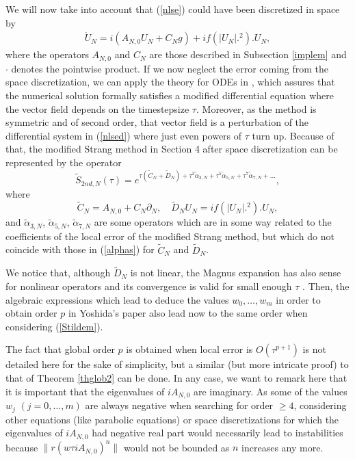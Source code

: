 \documentclass[a4paper,12pt]{article}
\begin{document}
We will now take into account that (\ref{nlse}) could have been discretized in space by
\begin{eqnarray}
\dot{U}_N=i (A_{N,0}U_N+ C_N g)+i f(|U_N|.^2). U_N,
\label{nlsed}
\end{eqnarray}
where the operators $A_{N,0}$ and $C_N$ are those described in Subsection \ref{implem} and $\cdot$ denotes the pointwise product.
If we now neglect the error coming from the space discretization, we can apply the theory for ODEs in \cite{Hairer_IG}, which assures that
the numerical solution formally satisfies a modified differential equation where the vector field depends on the timestepsize $\tau$. Moreover, as the method is symmetric and of second order, that vector field is a perturbation of the differential system in (\ref{nlsed}) where just even powers of $\tau$ turn up. Because of that, the modified Strang method in Section 4 after space discretization can be represented by the operator
$$
\tilde{S}_{2nd,N}(\tau)=e^{\tau(\tilde{C}_N+\tilde{D}_N)+\tau^3 \tilde{\alpha}_{3,N}+\tau^5 \tilde{\alpha}_{5,N}+\tau^7 \tilde{\alpha}_{7,N}+\dots},$$
where
$$\tilde{C}_N=A_{N,0}+C_N \partial_N, \quad \tilde{D}_N U_N=i f(|U_N|.^2). U_N,$$
and $\tilde{\alpha}_{3,N}$, $\tilde{\alpha}_{5,N}$, $\tilde{\alpha}_{7,N}$ are some operators which are in some way related to the coefficients of the local error of the modified Strang method, but which do not coincide with those in (\ref{alphas}) for $\tilde{C}_N$ and $\tilde{D}_N$.

We notice that, although $\tilde{D}_N$ is not linear, the Magnus expansion has also sense for nonlinear operators \cite{BCOR} and its convergence is valid for small enough $\tau$ \cite{AG}. Then, the algebraic expressions which lead to deduce the values $w_0,\dots,w_m$ in order to obtain order $p$ in Yoshida's paper \cite{Y} also lead now to the same order when considering (\ref{Stildem}).

The fact that global order $p$ is obtained when local error is $O(\tau^{p+1})$ is not detailed here for the sake of simplicity, but a similar (but more intricate proof) to that of Theorem \ref{thglob2}
can be done. In any case, we want to remark here that it is important that the eigenvalues of $i A_{N,0}$ are imaginary. As some of the values $w_j$ $(j=0,\dots,m)$ are always negative when searching for order $\ge 4$, considering other equations (like parabolic equations) or space discretizations for which the eigenvalues of $i A_{N,0}$ had negative real part would necessarily lead to instabilities  because $\|r(w \tau i A_{N,0})^n\|$ would not be bounded as $n$ increases any more.
\end{document}

